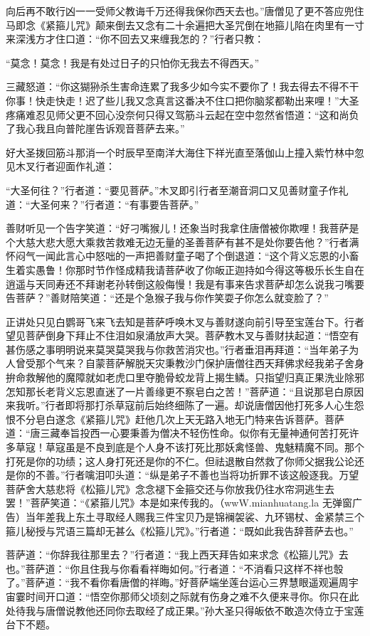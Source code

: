 \documentclass[12pt,UTF8]{ctexbook}
\begin{document}
向后再不敢行凶一一受师父教诲千万还得我保你西天去也。”唐僧见了更不答应兜住马即念《紧箍儿咒》颠来倒去又念有二十余遍把大圣咒倒在地箍儿陷在肉里有一寸来深浅方才住口道：“你不回去又来缠我怎的？”行者只教：

“莫念！莫念！我是有处过日子的只怕你无我去不得西天。”

三藏怒道：“你这猢狲杀生害命连累了我多少如今实不要你了！我去得去不得不干你事！快走快走！迟了些儿我又念真言这番决不住口把你脑浆都勒出来哩！”大圣疼痛难忍见师父更不回心没奈何只得又驾筋斗云起在空中忽然省悟道：“这和尚负了我心我且向普陀崖告诉观音菩萨去来。”

好大圣拨回筋斗那消一个时辰早至南洋大海住下祥光直至落伽山上撞入紫竹林中忽见木叉行者迎面作礼道：

“大圣何往？”行者道：“要见菩萨。”木叉即引行者至潮音洞口又见善财童子作礼道：“大圣何来？”行者道：“有事要告菩萨。”

善财听见一个告字笑道：“好刁嘴猴儿！还象当时我拿住唐僧被你欺哩！我菩萨是个大慈大悲大愿大乘救苦救难无边无量的圣善菩萨有甚不是处你要告他？”行者满怀闷气一闻此言心中怒咄的一声把善财童子喝了个倒退道：“这个背义忘恩的小畜生着实愚鲁！你那时节作怪成精我请菩萨收了你皈正迦持如今得这等极乐长生自在逍遥与天同寿还不拜谢老孙转倒这般侮慢！我是有事来告求菩萨却怎么说我刁嘴要告菩萨？”善财陪笑道：“还是个急猴子我与你作笑耍子你怎么就变脸了？”

正讲处只见白鹦哥飞来飞去知是菩萨呼唤木叉与善财遂向前引导至宝莲台下。行者望见菩萨倒身下拜止不住泪如泉涌放声大哭。菩萨教木叉与善财扶起道：“悟空有甚伤感之事明明说来莫哭莫哭我与你救苦消灾也。”行者垂泪再拜道：“当年弟子为人曾受那个气来？自蒙菩萨解脱天灾秉教沙门保护唐僧往西天拜佛求经我弟子舍身拚命救解他的魔障就如老虎口里夺脆骨蛟龙背上揭生鳞。只指望归真正果洗业除邪怎知那长老背义忘恩直迷了一片善缘更不察皂白之苦！”菩萨道：“且说那皂白原因来我听。”行者即将那打杀草寇前后始终细陈了一遍。却说唐僧因他打死多人心生怨恨不分皂白遂念《紧箍儿咒》赶他几次上天无路入地无门特来告诉菩萨。菩萨道：“唐三藏奉旨投西一心要秉善为僧决不轻伤性命。似你有无量神通何苦打死许多草寇！草寇虽是不良到底是个人身不该打死比那妖禽怪兽、鬼魅精魔不同。那个打死是你的功绩；这人身打死还是你的不仁。但祛退散自然救了你师父据我公论还是你的不善。”行者噙泪叩头道：“纵是弟子不善也当将功折罪不该这般逐我。万望菩萨舍大慈悲将《松箍儿咒》念念褪下金箍交还与你放我仍往水帘洞逃生去罢！”菩萨笑道：“《紧箍儿咒》本是如来传我的。（wwW.mianhuatang.la 无弹窗广告）当年差我上东土寻取经人赐我三件宝贝乃是锦襕袈裟、九环锡杖、金紧禁三个箍儿秘授与咒语三篇却无甚么《松箍儿咒》。”行者道：“既如此我告辞菩萨去也。”

菩萨道：“你辞我往那里去？”行者道：“我上西天拜告如来求念《松箍儿咒》去也。”菩萨道：“你且住我与你看看祥晦如何。”行者道：“不消看只这样不祥也彀了。”菩萨道：“我不看你看唐僧的祥晦。”好菩萨端坐莲台运心三界慧眼遥观遍周宇宙霎时间开口道：“悟空你那师父顷刻之际就有伤身之难不久便来寻你。你只在此处待我与唐僧说教他还同你去取经了成正果。”孙大圣只得皈依不敢造次侍立于宝莲台下不题。
\end{document}
